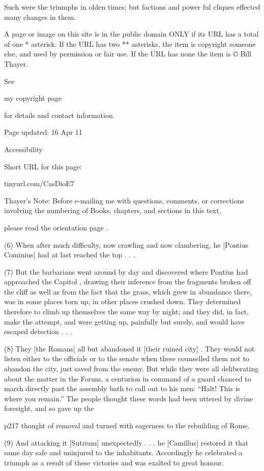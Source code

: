 Such were the triumphs in olden times; but factions and power ­ful cliques effected many changes in them.

A page or image on this site is in the public domain ONLY if its URL has a total of one * asterisk. If the URL has two ** asterisks, the item is copyright someone else, and used by permission or fair use. If the URL has none the item is \emph{©} Bill Thayer.

See

my copyright page

for details and contact information.

Page updated:
16 Apr 11

Accessibility


Short URL for this page:

tinyurl.com/CasDioE7

Thayer's Note: Before e-mailing me with questions, comments, or corrections involving the numbering of Books, chapters, and sections in this text,

please read the orientation page .

(6) When after much difficulty, now crawling and now clambering, he [Pontius Cominius] had at last reached the top . . .

(7) But the barbarians went around by day and discovered where Pontius had approached the Capitol , drawing their inference from the fragments broken off the cliff as well as from the fact that the grass, which grew in abundance there, was in some places torn up, in other places crushed down. They determined therefore to climb up themselves the same way by night; and they did, in fact, make the attempt, and were getting up, painfully but surely, and would have escaped detection . . .

(8) They [the Romans] all but abandoned it [their ruined city] . They would not listen either to the officials or to the senate when these counselled them not to abandon the city, just saved from the enemy. But while they were all deliberating about the matter in the Forum, a centurion in command of a guard chanced to march directly past the assembly bath to call out to his men: ``Halt! This is where you remain.'' The people thought these words had been uttered by divine foresight, and so gave up the

p217 thought of removal and turned with eagerness to the rebuilding of Rome.

(9) And attacking it [Sutrium] unexpectedly . . . he [Camillus] restored it that same day safe and uninjured to the inhabitants. Accordingly he celebrated a triumph as a result of these victories and was exalted to great honour.

